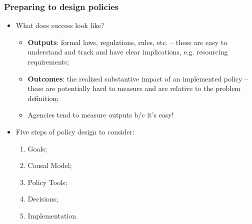 \documentclass[aspectratio=169]{beamer}
\theoremstyle{principle}
\begin{document}
\begin{frame}
\frametitle{Preparing to design policies}
\begin{itemize}
\item What does success look like?
\begin{itemize}
\item \textbf{Outputs}: formal laws, regulations, rules, etc. -- these are easy to understand and track and have clear implications, e.g. resourcing requirements;
\item \textbf{Outcomes}: the realized substantive impact of an implemented policy -- these are potentially hard to measure and are relative to the problem definition;
\item Agencies tend to measure outputs b/c it's easy!
\end{itemize}
\bigskip
\item Five steps of policy design to consider:
\begin{enumerate}
\item Goals;
\item Causal Model;
\item Policy Tools;
\item Decisions;
\item Implementation.
\end{enumerate}
\end{itemize}
\end{frame}
\end{document}
